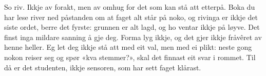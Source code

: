 So riv. Ikkje av forakt, men av omhug for det som kan stå att etterpå. Boka du har lese river ned påstanden om at faget alt står på noko, og rivinga er ikkje det siste ordet, berre det fyrste: grunnen er alt lagd, og ho ventar ikkje på løyve. Det finst inga mildare sanning å gje deg. Forma lyg ikkje, og det gjer ikkje fråvêret av henne heller. Eg let deg ikkje stå att med eit val, men med ei plikt: neste gong nokon reiser seg og spør «kva stemmer?», skal det finnast eit svar i rommet. Til då er det studenten, ikkje sensoren, som har sett faget klårast.

